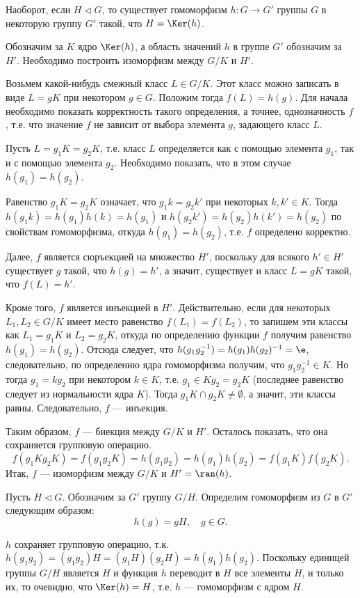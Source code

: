 \begin{enumerate}
\begin{thrm}
Наоборот, если $H\vartriangleleft G$, то существует гомоморфизм $h:G\to G'$ группы $G$ в некоторую группу $G'$ такой, что $H=\Ker(h)$.
\end{thrm}
\pf
Обозначим за $K$ ядро $\Ker(h)$, а область значений $h$ в группе $G'$ обозначим за $H'$. Необходимо построить изоморфизм между $G/K$ и $H'$.

Возьмем какой-нибудь смежный класс $L\in G/K$. Этот класс можно записать в виде $L=gK$ при некотором $g\in G$. Положим тогда $f(L)=h(g)$. Для начала необходимо показать корректность такого определения, а точнее, однозначность $f$, т.е. что значение $f$ не зависит от выбора элемента $g$, задающего класс $L$.

Пусть $L=g_1K=g_2K$, т.е. класс $L$ определяется как с помощью элемента $g_1$, так и с помощью элемента $g_2$. Необходимо показать, что в этом случае $h(g_1)=h(g_2)$.

Равенство $g_1K=g_2K$ означает, что $g_1k=g_2k'$ при некоторых $k,k'\in K$. Тогда $h(g_1k)=h(g_1)h(k)=h(g_1)$ и $h(g_2k')=h(g_2)h(k')=h(g_2)$ по свойствам гомоморфизма, откуда $h(g_1)=h(g_2)$, т.е. $f$ определено корректно.

Далее, $f$ является сюръекцией на множество $H'$, поскольку для всякого $h'\in H'$ существует $g$ такой, что $h(g)=h'$, а значит, существует и класс $L=gK$ такой, что $f(L)=h'$.

Кроме того, $f$ является инъекцией в $H'$. Действительно, если для некоторых $L_1,L_2\in G/K$ имеет место равенство $f(L_1)=f(L_2)$, то запишем эти классы как $L_1=g_1K$ и $L_2=g_2K$, откуда по определению функции $f$ получим равенство $h(g_1)=h(g_2)$. Отсюда следует, что $h(g_1g_2^{-1})=h(g_1)h(g_2)^{-1}=\e$, следовательно, по определению ядра гомоморфизма получим, что $g_1g_2^{-1}\in K$. Но тогда $g_1=kg_2$ при некотором $k\in K$, т.е. $g_1\in Kg_2=g_2K$ (последнее равенство следует из нормальности ядра $K$). Тогда $g_1K\cap g_2K\ne\emptyset$, а значит, эти классы равны. Следовательно, $f$ --- инъекция.

Таким образом, $f$ --- биекция между $G/K$ и $H'$. Осталось показать, что она сохраняется групповую операцию.
$$
f(g_1Kg_2K)=f(g_1g_2K)=h(g_1g_2)=h(g_1)h(g_2)=f(g_1K)f(g_2K).
$$
Итак, $f$ --- изоморфизм между $G/K$ и $H'=\ran(h)$.

Пусть $H\vartriangleleft G$. Обозначим за $G'$ группу $G/H$. Определим гомоморфизм из $G$ в $G'$ следующим образом:
$$
h(g)=gH, \quad g\in G.
$$

$h$ сохраняет групповую операцию, т.к. $h(g_1g_2)=(g_1g_2)H=(g_1H)(g_2H)=h(g_1)h(g_2)$. Поскольку единицей группы $G/H$ является $H$ и функция $h$ переводит в $H$ все элементы $H$, и только их, то очевидно, что $\Ker(h)=H$, т.е. $h$ --- гомоморфизм с ядром $H$.
\epf






\end{enumerate}





